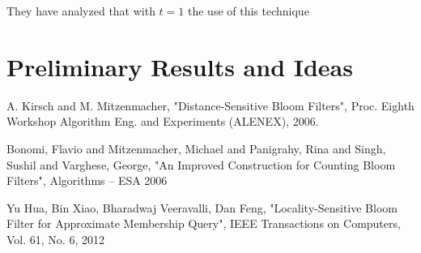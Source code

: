 \documentclass[a4paper,11pt]{article}
\begin{document}
They have analyzed that with $t = 1$ the use of this technique 

\section{Preliminary Results and Ideas}

\begin{thebibliography}{}

A. Kirsch and M. Mitzenmacher, "Distance-Sensitive Bloom Filters", Proc. Eighth Workshop Algorithm Eng. and Experiments (ALENEX), 2006.

Bonomi, Flavio and Mitzenmacher, Michael and Panigrahy, Rina and Singh, Sushil and Varghese, George, "An Improved Construction for Counting Bloom Filters", Algorithms – ESA 2006 

Yu Hua, Bin Xiao, Bharadwaj Veeravalli, Dan Feng, "Locality-Sensitive Bloom Filter for Approximate Membership Query", IEEE Transactions on Computers, Vol. 61, No. 6, 2012
 
\end{thebibliography}
\end{document}
